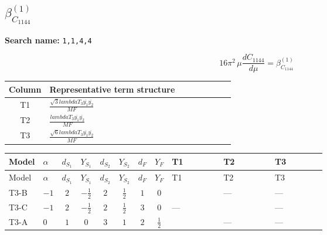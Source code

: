 \documentclass[8pt]{article}
\begin{document}
\begin{landscape}
\section*{$\beta_{C_{1144}}^{(1)}$}
\noindent\textbf{Search name: }\texttt{1,1,4,4}\par\smallskip
\[16\pi^2\,\mu\frac{d C_{1144}}{d\mu}=\beta_{C_{1144}}^{(1)}\]
\begin{center}
\begin{tabular}{@{}c >{\raggedright\arraybackslash}p{0.82\linewidth}@{}}
\toprule
Column & Representative term structure \\
\midrule
T1 & \(\displaystyle \frac{\sqrt{3} lambdaT_{3} \overline{y_{1}} \overline{y_{2}}}{MF}\) \\
\midrule
T2 & \(\displaystyle \frac{lambdaT_{3} \overline{y_{1}} \overline{y_{2}}}{MF}\) \\
\midrule
T3 & \(\displaystyle \frac{\sqrt{6} lambdaT_{3} \overline{y_{1}} \overline{y_{2}}}{MF}\) \\
\midrule
\bottomrule
\end{tabular}
\end{center}
\smallskip
\tiny
\begin{longtable}{@{}llcccccc >{\raggedright\arraybackslash}p{0.21\linewidth} >{\raggedright\arraybackslash}p{0.21\linewidth} >{\raggedright\arraybackslash}p{0.21\linewidth}@{}}
\toprule
Model & $\alpha$ & $d_{S_1}$ & $Y_{S_1}$ & $d_{S_2}$ & $Y_{S_2}$ & $d_F$ & $Y_F$ & T1 & T2 & T3 \\
\midrule
\endfirsthead
\toprule
Model & $\alpha$ & $d_{S_1}$ & $Y_{S_1}$ & $d_{S_2}$ & $Y_{S_2}$ & $d_F$ & $Y_F$ & T1 & T2 & T3 \\
\midrule
\endhead
T3-B & $-1$ & $2$ & $-\frac{1}{2}$ & $2$ & $\frac{1}{2}$ & $1$ & $0$ & \scriptsize\adjustbox{max width=\linewidth}{$\begin{gathered} - \frac{2 \sqrt{3} lambdaT_{3} \overline{y_{1}} \overline{y_{2}}}{3 MF}\end{gathered}$} & --- & --- \\
\midrule
T3-C & $-1$ & $2$ & $-\frac{1}{2}$ & $2$ & $\frac{1}{2}$ & $3$ & $0$ & --- & \scriptsize\adjustbox{max width=\linewidth}{$\begin{gathered} \frac{2 lambdaT_{3} \overline{y_{1}} \overline{y_{2}}}{3 MF}\end{gathered}$} & --- \\
\midrule
T3-A & $0$ & $1$ & $0$ & $3$ & $1$ & $2$ & $\frac{1}{2}$ & \scriptsize\adjustbox{max width=\linewidth}{$\begin{gathered} - \frac{2 \sqrt{3} lambdaT_{3} \overline{y_{1}} \overline{y_{2}}}{3 MF}\end{gathered}$} & --- & --- \\

\end{longtable}
\end{landscape}
\end{document}
